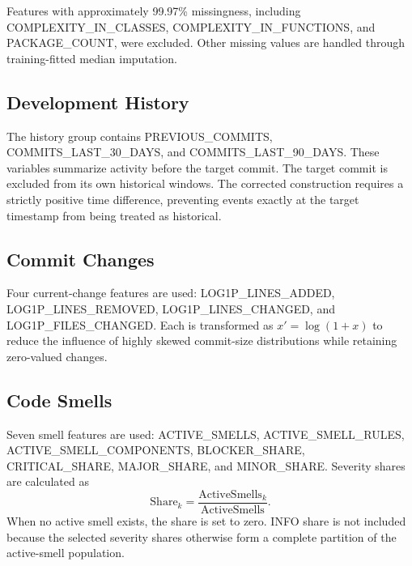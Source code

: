 \documentclass[conference]{IEEEtran}
\begin{document}
Features with approximately 99.97\% missingness, including COMPLEXITY\_IN\_CLASSES, COMPLEXITY\_IN\_FUNCTIONS, and PACKAGE\_COUNT, were excluded. Other missing values are handled through training-fitted median imputation.

\subsection{Development History}
The history group contains PREVIOUS\_COMMITS, COMMITS\_LAST\_30\_DAYS, and COMMITS\_LAST\_90\_DAYS. These variables summarize activity before the target commit. The target commit is excluded from its own historical windows. The corrected construction requires a strictly positive time difference, preventing events exactly at the target timestamp from being treated as historical.

\subsection{Commit Changes}
Four current-change features are used: LOG1P\_LINES\_ADDED, LOG1P\_LINES\_REMOVED, LOG1P\_LINES\_CHANGED, and LOG1P\_FILES\_CHANGED. Each is transformed as $x'=\log(1+x)$ to reduce the influence of highly skewed commit-size distributions while retaining zero-valued changes.

\subsection{Code Smells}
Seven smell features are used: ACTIVE\_SMELLS, ACTIVE\_SMELL\_RULES, ACTIVE\_SMELL\_COMPONENTS, BLOCKER\_SHARE, CRITICAL\_SHARE, MAJOR\_SHARE, and MINOR\_SHARE. Severity shares are calculated as
\begin{equation}
\mathrm{Share}_k=\frac{\mathrm{ActiveSmells}_k}{\mathrm{ActiveSmells}}.
\end{equation}
When no active smell exists, the share is set to zero. INFO share is not included because the selected severity shares otherwise form a complete partition of the active-smell population.
\end{document}
